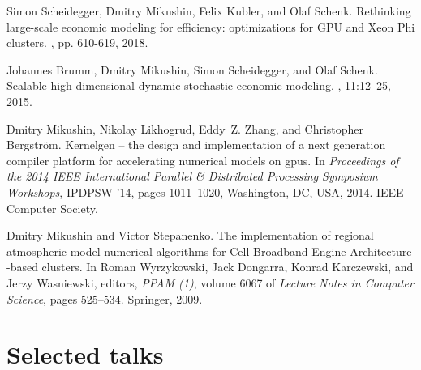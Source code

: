 \documentclass[a4paper]{moderncv}
\begin{document}
\begin{thebibliography}{1}

 Simon Scheidegger, Dmitry Mikushin, Felix Kubler, and Olaf Schenk.
\newblock Rethinking large-scale economic modeling for efficiency: optimizations for GPU and Xeon Phi clusters.
, pp. 610-619, 2018.

Johannes Brumm, Dmitry Mikushin, Simon Scheidegger, and Olaf Schenk.
\newblock Scalable high-dimensional dynamic stochastic economic modeling.
, 11:12--25, 2015.

Dmitry Mikushin, Nikolay Likhogrud, Eddy~Z. Zhang, and Christopher
  Bergstr\"{o}m.
\newblock Kernelgen -- the design and implementation of a next generation
  compiler platform for accelerating numerical models on gpus.
\newblock In {\em Proceedings of the 2014 IEEE International Parallel \&
  Distributed Processing Symposium Workshops}, IPDPSW '14, pages 1011--1020,
  Washington, DC, USA, 2014. IEEE Computer Society.

Dmitry Mikushin and Victor Stepanenko.
\newblock The implementation of regional atmospheric model numerical algorithms
  for {Cell} {Broadband} {Engine} {Architecture} -based clusters.
\newblock In Roman Wyrzykowski, Jack Dongarra, Konrad Karczewski, and Jerzy
  Wasniewski, editors, {\em PPAM (1)}, volume 6067 of {\em Lecture Notes in
  Computer Science}, pages 525--534. Springer, 2009.

\end{thebibliography}

\section{Selected talks}
{\small
{}}
\end{document}

